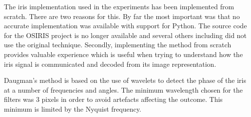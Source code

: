 The iris implementation used in the experiments has been implemented from scratch. There are two reasons for this. By far the most important was that no accurate implementation was available with support for Python. The source code for the OSIRIS project \parencite{osiris} is no longer available and several others including \parencite{rec1, rec2, rec3} did not use the original technique. Secondly, implementing the method from scratch provides valuable experience which is useful when trying to understand how the iris signal is communicated and decoded from its image representation.



Daugman's method is based on the use of wavelets to detect the phase of the iris at a number of frequencies and angles. The minimum wavelength chosen for the filters was 3 pixels in order to avoid artefacts affecting the outcome. This minimum is limited by the Nyquist frequency.

